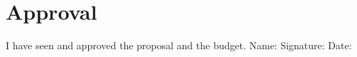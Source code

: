 \documentclass[11pt, a4paper, titlepage]{article}
\begin{document}
\newpage

\printbibliography

\newpage

\section{Approval}

I have seen and approved the proposal and the budget. 
\newline
\newline
\newline
\noindent Name:
\newline
\newline
\newline
\newline
Signature:
\newline
\newline
\newline
\newline
Date:
\end{document}
